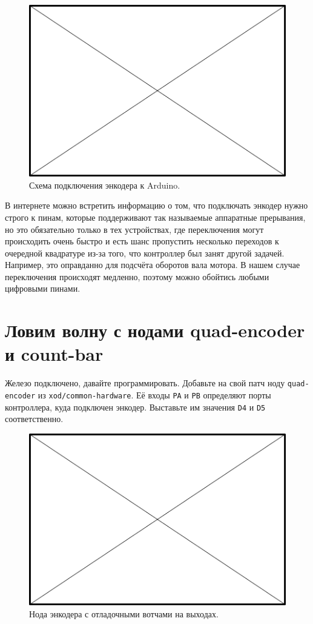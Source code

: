 \begin{figure}
  \centering
  \includegraphics{TODO.png}
  \caption{Схема подключения энкодера к Arduino.}
  \label{encoder-wiring}
\end{figure}

В интернете можно встретить информацию о том, что подключать энкодер нужно строго к пинам, которые поддерживают так называемые аппаратные прерывания, но это обязательно только в тех устройствах, где переключения могут происходить очень быстро и есть шанс пропустить несколько переходов к очередной квадратуре из-за того, что контроллер был занят другой задачей. Например, это оправданно для подсчёта оборотов вала мотора. В нашем случае переключения происходят медленно, поэтому можно обойтись любыми цифровыми пинами.

\section{Ловим волну с нодами quad-encoder и count-bar}

Железо подключено, давайте программировать. Добавьте на свой патч ноду \texttt{quad-encoder} из \texttt{xod/common-hardware}. Её входы \texttt{PA} и \texttt{PB} определяют порты контроллера, куда подключен энкодер. Выставьте им значения \texttt{D4} и \texttt{D5} соответственно.

\begin{figure}
  \centering
  \includegraphics{TODO.png}
  \caption{Нода энкодера с отладочными вотчами на выходах.}
\end{figure}

